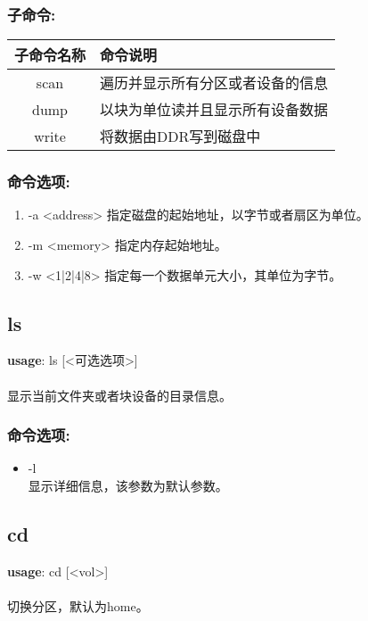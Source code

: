 \subsubsection{子命令:}
\begin{table}[H]
\setlength{\parindent}{0pt}
\begin{tabular}{|c|l|} \hline
子命令名称 & 命令说明 \\ \hline
scan & 遍历并显示所有分区或者设备的信息 \\ \hline
dump & 以块为单位读并且显示所有设备数据 \\ \hline
write & 将数据由DDR写到磁盘中 \\ \hline
\end{tabular}
\end{table}

\subsubsection{命令选项:}
\begin{enumerate}
	\item -a <address>
	指定磁盘的起始地址，以字节或者扇区为单位。
	\item -m <memory>
	指定内存起始地址。
	\item -w <1|2|4|8>
	指定每一个数据单元大小，其单位为字节。
\end{enumerate}

\subsection{ls}
\textbf{usage}: ls [<可选选项>] \\
\\ 显示当前文件夹或者块设备的目录信息。

\subsubsection{命令选项:}
\begin{itemize}
	\item -l \\
	显示详细信息，该参数为默认参数。
\end{itemize}

\subsection{cd}
\textbf{usage}: cd [<vol>] \\
\\ 切换分区，默认为home。

